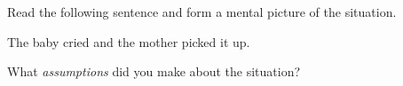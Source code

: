 Read the following sentence and form a mental picture of the situation.
\begin{center}
The baby cried and the mother picked it up.
\end{center}
What {\em assumptions} did you make about the situation?